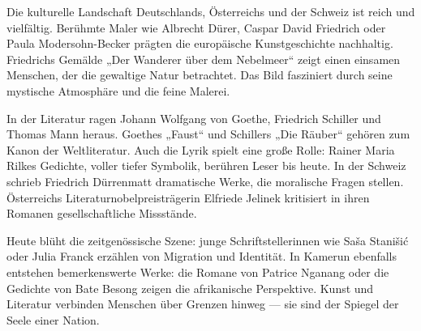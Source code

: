 \documentclass[11pt]{article}
\begin{document}
\begin{textebox}
Die kulturelle Landschaft Deutschlands, Österreichs und der Schweiz ist reich und vielfältig. Berühmte Maler wie Albrecht Dürer, Caspar David Friedrich oder Paula Modersohn-Becker prägten die europäische Kunstgeschichte nachhaltig. Friedrichs Gemälde „Der Wanderer über dem Nebelmeer“ zeigt einen einsamen Menschen, der die gewaltige Natur betrachtet. Das Bild fasziniert durch seine mystische Atmosphäre und die feine Malerei.

In der Literatur ragen Johann Wolfgang von Goethe, Friedrich Schiller und Thomas Mann heraus. Goethes „Faust“ und Schillers „Die Räuber“ gehören zum Kanon der Weltliteratur. Auch die Lyrik spielt eine große Rolle: Rainer Maria Rilkes Gedichte, voller tiefer Symbolik, berühren Leser bis heute. In der Schweiz schrieb Friedrich Dürrenmatt dramatische Werke, die moralische Fragen stellen. Österreichs Literaturnobelpreisträgerin Elfriede Jelinek kritisiert in ihren Romanen gesellschaftliche Missstände.

Heute blüht die zeitgenössische Szene: junge Schriftstellerinnen wie Saša Stanišić oder Julia Franck erzählen von Migration und Identität. In Kamerun ebenfalls entstehen bemerkenswerte Werke: die Romane von Patrice Nganang oder die Gedichte von Bate Besong zeigen die afrikanische Perspektive. Kunst und Literatur verbinden Menschen über Grenzen hinweg — sie sind der Spiegel der Seele einer Nation.
\end{textebox}
\end{document}
